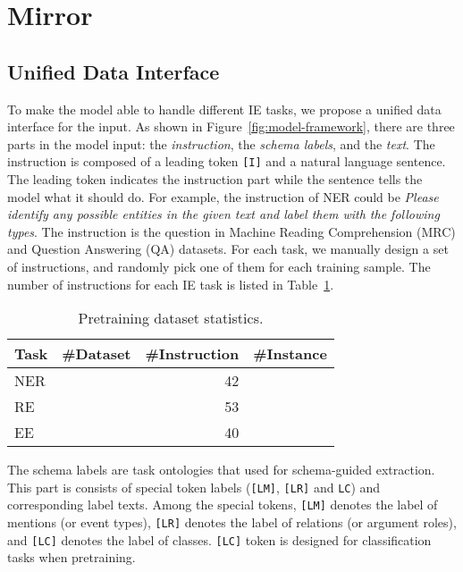 \section{Mirror}


\subsection{Unified Data Interface}

To make the model able to handle different IE tasks, we propose a unified data interface for the input.
As shown in Figure~\ref{fig:model-framework}, there are three parts in the model input: the \textit{instruction}, the \textit{schema labels}, and the \textit{text}.
The instruction is composed of a leading token \verb|[I]| and a natural language sentence.
The leading token indicates the instruction part while the sentence tells the model what it should do.
For example, the instruction of NER could be \textit{Please identify any possible entities in the given text and label them with the following types}.
The instruction is the question in Machine Reading Comprehension (MRC) and Question Answering (QA) datasets.
For each task, we manually design a set of instructions, and randomly pick one of them for each training sample.
The number of instructions for each IE task is listed in Table~\ref{tab:pretrain-dataset-statistics}.

\begin{table}[t]
    \centering
    \begin{tabular}{lrrr}
        \toprule
        Task & \#Dataset & \#Instruction & \#Instance \\
        \midrule
        NER &  & 42 &  \\
        RE &  & 53 &  \\
        EE &  & 40 &  \\
        \bottomrule
    \end{tabular}
    \caption{Pretraining dataset statistics.}
    \label{tab:pretrain-dataset-statistics}
\end{table}

The schema labels are task ontologies that used for schema-guided extraction.
This part is consists of special token labels (\verb|[LM]|, \verb|[LR]| and \verb|LC|) and corresponding label texts.
Among the special tokens, \verb|[LM]| denotes the label of mentions (or event types), \verb|[LR]| denotes the label of relations (or argument roles), and \verb|[LC]| denotes the label of classes.
\verb|[LC]| token is designed for classification tasks when pretraining.

